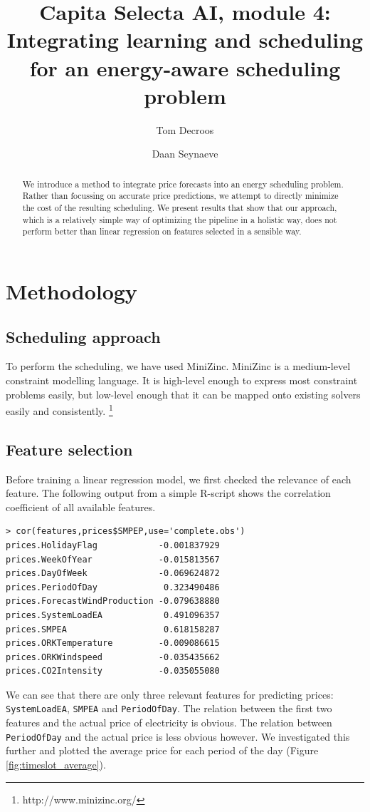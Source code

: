\documentclass{article}
\title{Capita Selecta AI, module 4:\\ Integrating learning and scheduling for an energy-aware scheduling problem}
\author{Tom Decroos \and Daan Seynaeve}
\begin{document}
\maketitle
\begin{abstract}
	We introduce a method to integrate price forecasts into an energy scheduling problem. Rather than focussing on accurate price predictions, we attempt to directly minimize the cost of the resulting scheduling. We present results that show that our approach, which is a relatively simple way of optimizing the pipeline in a holistic way, does not perform better than linear regression on features selected in a sensible way.
\end{abstract}
\section{Methodology}
\subsection{Scheduling approach}
To perform the scheduling, we have used MiniZinc. MiniZinc is a medium-level constraint modelling language. It is high-level enough to express most constraint problems easily, but low-level enough that it can be mapped onto existing solvers easily and consistently. \footnote{http://www.minizinc.org/}

\subsection{Feature selection}
Before training a linear regression model, we first checked the relevance of each feature. The following output from a simple R-script shows the correlation coefficient of all available features.
\begin{verbatim}
> cor(features,prices$SMPEP,use='complete.obs')
prices.HolidayFlag            -0.001837929
prices.WeekOfYear             -0.015813567
prices.DayOfWeek              -0.069624872
prices.PeriodOfDay             0.323490486
prices.ForecastWindProduction -0.079638880
prices.SystemLoadEA            0.491096357
prices.SMPEA                   0.618158287
prices.ORKTemperature         -0.009086615
prices.ORKWindspeed           -0.035435662
prices.CO2Intensity           -0.035055080
\end{verbatim}
We can see that there are only three relevant features for predicting prices: \verb|SystemLoadEA|, \verb|SMPEA| and \verb|PeriodOfDay|. The relation between the first two features and the actual price of electricity is obvious. The relation between \verb|PeriodOfDay| and the actual price is less obvious however. We investigated this further and plotted the average price for each period of the day (Figure \ref{fig:timeslot_average}).
\end{document}
